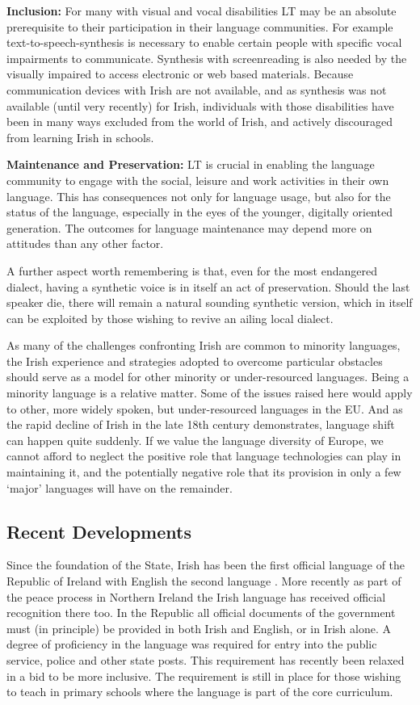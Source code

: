 \begin{multicols}{2}
\textbf{Inclusion:} For many with visual and vocal disabilities LT may be an absolute prerequisite to their participation in their language communities.  For example text-to-speech-synthesis is necessary to enable certain people with specific vocal impairments to communicate.  Synthesis with screenreading is also needed by the visually impaired to access electronic or web based materials.  Because communication devices with Irish are not available, and as synthesis was not available (until very recently) for Irish, individuals with those disabilities have been in many ways excluded from the world of Irish, and actively discouraged from learning Irish in schools.

\textbf{Maintenance and Preservation:} LT is crucial in enabling the language community to engage with the social, leisure and work activities in their own language. This has consequences not only for language usage, but also for the status of the language, especially in the eyes of the younger, digitally oriented generation. The outcomes for language maintenance may depend more on attitudes than any other factor.

A further aspect worth remembering is that, even for the most endangered dialect, having a synthetic voice is in itself an act of preservation. Should the last speaker die, there will remain a natural sounding synthetic version, which in itself can be exploited by those wishing to revive an ailing local dialect.

As many of the challenges confronting Irish are common to minority languages, the Irish experience and strategies adopted to overcome particular obstacles should serve as a model for other minority or under-resourced languages. Being a minority language is a relative matter. Some of the issues raised here would apply to other, more widely spoken, but under-resourced languages in the EU. And as the rapid decline of Irish in the late 18th century demonstrates, language shift can happen quite suddenly. If we value the language diversity of Europe, we cannot afford to neglect the positive role that language technologies can play in maintaining it, and the potentially negative role that its provision in only a few `major' languages will have on the remainder.


\subsection{Recent Developments}

Since the foundation of the State, Irish has been the first official language of the Republic of Ireland with English the second language \cite{oriagain97}. More recently as part of the peace process in Northern Ireland the Irish language has received official recognition there too. In the Republic all official documents of the government must (in principle) be provided in both Irish and English, or in Irish alone. A degree of proficiency in the language was required for entry into the public service, police and other state posts. This requirement has recently been relaxed in a bid to be more inclusive. The requirement is still in place for those wishing to teach in primary schools where the language is part of the core curriculum.


\end{multicols}
